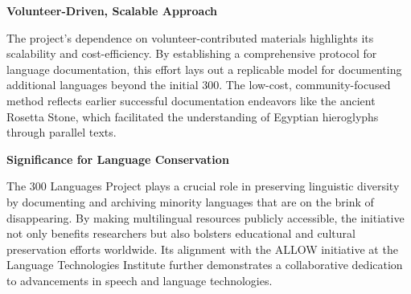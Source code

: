 \textbf{Volunteer-Driven, Scalable Approach}

The project's dependence on volunteer-contributed materials highlights its scalability and cost-efficiency. By establishing a comprehensive protocol for language documentation, this effort lays out a replicable model for documenting additional languages beyond the initial 300. The low-cost, community-focused method reflects earlier successful documentation endeavors like the ancient Rosetta Stone, which facilitated the understanding of Egyptian hieroglyphs through parallel texts.

\textbf{Significance for Language Conservation}

The 300 Languages Project plays a crucial role in preserving linguistic diversity by documenting and archiving minority languages that are on the brink of disappearing. By making multilingual resources publicly accessible, the initiative not only benefits researchers but also bolsters educational and cultural preservation efforts worldwide. Its alignment with the ALLOW initiative at the Language Technologies Institute further demonstrates a collaborative dedication to advancements in speech and language technologies.

\begin{comment}
\section{Chapter Summary}
Should include a table of related studies comparing them based on several criteria.

Highlight research gaps and the research problem.
\end{comment}












